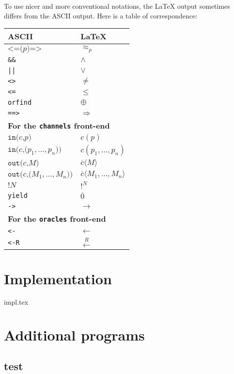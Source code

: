 \documentclass{article}
\begin{document}
To use nicer and more conventional notations, the {\LaTeX} output sometimes
differs from the ASCII output. Here is a table of correspondence:
\begin{center}
\begin{tabular}{l|l}
ASCII&{\LaTeX}\\
\hline
$\texttt{<=(}p\texttt{)=>}$& $\approx_p$\\
\texttt{\&\&}&$\wedge$\\
\texttt{||}&$\vee$\\
\texttt{<>}&$\neq$\\
\texttt{<=}&$\leq$\\
\texttt{orfind}&$\oplus$\\
\texttt{==>}&$\Longrightarrow$\\
\hline
\multicolumn{2}{l}{\textbf{For the \texttt{channels} front-end}}\\
\hline
$\texttt{in(}c\texttt{,}p\texttt{)}$& $c(p)$\\
$\texttt{in(}c\texttt{,(}p_1, \ldots, p_n\texttt{))}$& $c(p_1, \ldots, p_n)$\\
$\texttt{out(}c\texttt{,}M\texttt{)}$& $\overline{c}\langle M\rangle$\\
$\texttt{out(}c\texttt{,(}M_1, \ldots, M_n\texttt{))}$& $\overline{c}\langle M_1, \ldots, M_n\rangle$\\
$\texttt{!}N$&$!^N$\\
\texttt{yield}& $\overline{0}$\\
\texttt{->}& $\rightarrow$\\
\hline
\multicolumn{2}{l}{\textbf{For the \texttt{oracles} front-end}}\\
\hline
\texttt{<-}&$\leftarrow$\\
\texttt{<-R}&$\stackrel{R}{\leftarrow}$\\
\end{tabular}
\end{center}

\section{Implementation}
 {impl.tex}


\section{Additional programs}

\subsection{\ttfamily test}
\end{document}
